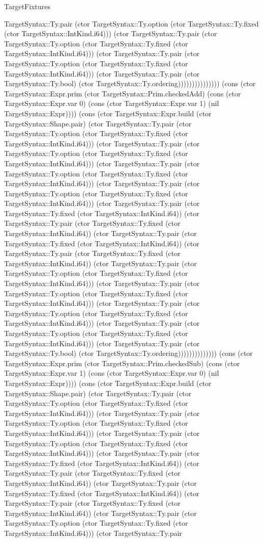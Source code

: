 \begin{lexlean}{TargetFixtures}
\begin{semanticmodule}
{TargetSyntax::Ty.pair (ctor TargetSyntax::Ty.option (ctor TargetSyntax::Ty.fixed (ctor TargetSyntax::IntKind.i64))) (ctor TargetSyntax::Ty.pair (ctor TargetSyntax::Ty.option (ctor TargetSyntax::Ty.fixed (ctor TargetSyntax::IntKind.i64))) (ctor TargetSyntax::Ty.pair (ctor TargetSyntax::Ty.option (ctor TargetSyntax::Ty.fixed (ctor TargetSyntax::IntKind.i64))) (ctor TargetSyntax::Ty.pair (ctor TargetSyntax::Ty.bool) (ctor TargetSyntax::Ty.ordering))))))))))))))) (cons (ctor TargetSyntax::Expr.prim (ctor TargetSyntax::Prim.checkedAdd) (cons (ctor TargetSyntax::Expr.var 0) (cons (ctor TargetSyntax::Expr.var 1) (nil TargetSyntax::Expr)))) (cons (ctor TargetSyntax::Expr.build (ctor TargetSyntax::Shape.pair) (ctor TargetSyntax::Ty.pair (ctor TargetSyntax::Ty.option (ctor TargetSyntax::Ty.fixed (ctor TargetSyntax::IntKind.i64))) (ctor TargetSyntax::Ty.pair (ctor TargetSyntax::Ty.option (ctor TargetSyntax::Ty.fixed (ctor TargetSyntax::IntKind.i64))) (ctor TargetSyntax::Ty.pair (ctor TargetSyntax::Ty.option (ctor TargetSyntax::Ty.fixed (ctor TargetSyntax::IntKind.i64))) (ctor TargetSyntax::Ty.pair (ctor TargetSyntax::Ty.option (ctor TargetSyntax::Ty.fixed (ctor TargetSyntax::IntKind.i64))) (ctor TargetSyntax::Ty.pair (ctor TargetSyntax::Ty.fixed (ctor TargetSyntax::IntKind.i64)) (ctor TargetSyntax::Ty.pair (ctor TargetSyntax::Ty.fixed (ctor TargetSyntax::IntKind.i64)) (ctor TargetSyntax::Ty.pair (ctor TargetSyntax::Ty.fixed (ctor TargetSyntax::IntKind.i64)) (ctor TargetSyntax::Ty.pair (ctor TargetSyntax::Ty.fixed (ctor TargetSyntax::IntKind.i64)) (ctor TargetSyntax::Ty.pair (ctor TargetSyntax::Ty.option (ctor TargetSyntax::Ty.fixed (ctor TargetSyntax::IntKind.i64))) (ctor TargetSyntax::Ty.pair (ctor TargetSyntax::Ty.option (ctor TargetSyntax::Ty.fixed (ctor TargetSyntax::IntKind.i64))) (ctor TargetSyntax::Ty.pair (ctor TargetSyntax::Ty.option (ctor TargetSyntax::Ty.fixed (ctor TargetSyntax::IntKind.i64))) (ctor TargetSyntax::Ty.pair (ctor TargetSyntax::Ty.option (ctor TargetSyntax::Ty.fixed (ctor TargetSyntax::IntKind.i64))) (ctor TargetSyntax::Ty.pair (ctor TargetSyntax::Ty.bool) (ctor TargetSyntax::Ty.ordering)))))))))))))) (cons (ctor TargetSyntax::Expr.prim (ctor TargetSyntax::Prim.checkedSub) (cons (ctor TargetSyntax::Expr.var 1) (cons (ctor TargetSyntax::Expr.var 0) (nil TargetSyntax::Expr)))) (cons (ctor TargetSyntax::Expr.build (ctor TargetSyntax::Shape.pair) (ctor TargetSyntax::Ty.pair (ctor TargetSyntax::Ty.option (ctor TargetSyntax::Ty.fixed (ctor TargetSyntax::IntKind.i64))) (ctor TargetSyntax::Ty.pair (ctor TargetSyntax::Ty.option (ctor TargetSyntax::Ty.fixed (ctor TargetSyntax::IntKind.i64))) (ctor TargetSyntax::Ty.pair (ctor TargetSyntax::Ty.option (ctor TargetSyntax::Ty.fixed (ctor TargetSyntax::IntKind.i64))) (ctor TargetSyntax::Ty.pair (ctor TargetSyntax::Ty.fixed (ctor TargetSyntax::IntKind.i64)) (ctor TargetSyntax::Ty.pair (ctor TargetSyntax::Ty.fixed (ctor TargetSyntax::IntKind.i64)) (ctor TargetSyntax::Ty.pair (ctor TargetSyntax::Ty.fixed (ctor TargetSyntax::IntKind.i64)) (ctor TargetSyntax::Ty.pair (ctor TargetSyntax::Ty.fixed (ctor TargetSyntax::IntKind.i64)) (ctor TargetSyntax::Ty.pair (ctor TargetSyntax::Ty.option (ctor TargetSyntax::Ty.fixed (ctor TargetSyntax::IntKind.i64))) (ctor TargetSyntax::Ty.pair }
\end{semanticmodule}
\end{lexlean}
